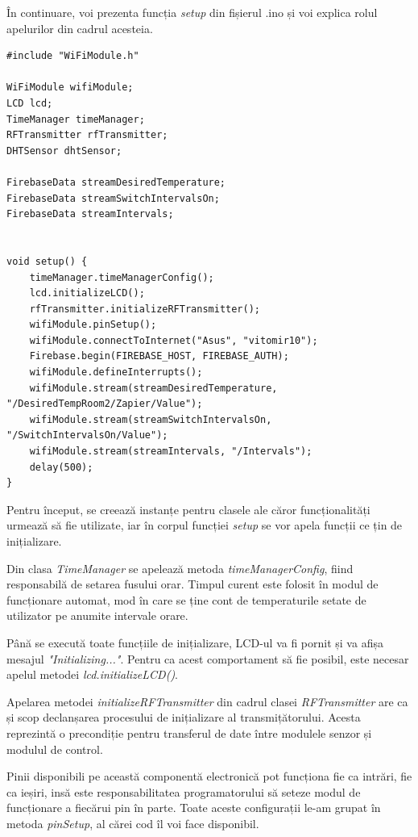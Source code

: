\vspace{1em}

	În continuare, voi prezenta funcția \textit{setup} din fișierul .ino și voi explica rolul apelurilor din cadrul acesteia.



\begin{lstlisting}
#include "WiFiModule.h"

WiFiModule wifiModule;
LCD lcd;
TimeManager timeManager;
RFTransmitter rfTransmitter;
DHTSensor dhtSensor;

FirebaseData streamDesiredTemperature;
FirebaseData streamSwitchIntervalsOn;
FirebaseData streamIntervals;


void setup() {
    timeManager.timeManagerConfig();
    lcd.initializeLCD();
    rfTransmitter.initializeRFTransmitter();
    wifiModule.pinSetup();
    wifiModule.connectToInternet("Asus", "vitomir10");
    Firebase.begin(FIREBASE_HOST, FIREBASE_AUTH);
    wifiModule.defineInterrupts();
    wifiModule.stream(streamDesiredTemperature, "/DesiredTempRoom2/Zapier/Value");
    wifiModule.stream(streamSwitchIntervalsOn, "/SwitchIntervalsOn/Value");  
    wifiModule.stream(streamIntervals, "/Intervals");
    delay(500);
}
\end{lstlisting}

\vspace{2em}

	Pentru început, se creează instanțe pentru clasele ale căror funcționalități urmează să fie utilizate, iar în corpul funcției \textit{setup} se vor apela funcții ce țin de inițializare.

	Din clasa \textit{TimeManager} se apelează metoda \textit{timeManagerConfig}, fiind responsabilă de setarea fusului orar. Timpul curent este folosit în modul de funcționare automat, mod în care se ține cont de temperaturile setate de utilizator pe anumite intervale orare. 

	Până se execută toate funcțiile de inițializare, LCD-ul va fi pornit și va afișa mesajul \textit{"Initializing..."}. Pentru ca acest comportament să fie posibil, este necesar apelul metodei \textit{lcd.initializeLCD()}. 	

	Apelarea metodei \textit{initializeRFTransmitter} din cadrul clasei \textit{RFTransmitter} are ca și scop declanșarea procesului de inițializare al transmițătorului. Acesta reprezintă o precondiție pentru transferul de date între modulele senzor și modulul de control.

	Pinii disponibili pe această componentă electronică pot funcționa fie ca intrări, fie ca ieșiri, insă este responsabilitatea programatorului să seteze modul de funcționare a fiecărui pin în parte. Toate aceste configurații le-am grupat în metoda \textit{pinSetup}, al cărei cod îl voi face disponibil.

